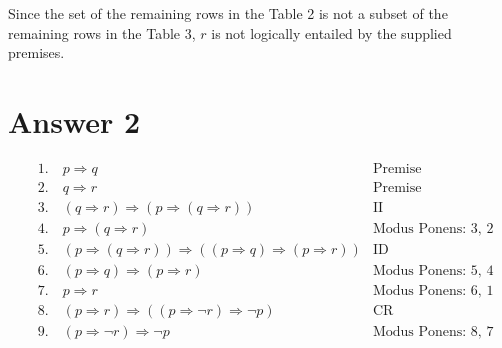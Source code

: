 \documentclass[12pt]{article}
\begin{document}
Since the set of the remaining rows in the Table 2 is not a subset of the remaining rows in the Table 3, $r$ is not logically entailed by the supplied premises.

\section*{Answer 2}

\begin{align*}
    & 1. \hspace{1em} p \Rightarrow q                                                                                    & \text{Premise} \\
    & 2. \hspace{1em} q \Rightarrow r                                                                                    & \text{Premise} \\
    & 3. \hspace{1em} (q \Rightarrow r) \Rightarrow (p \Rightarrow (q \Rightarrow r))                                    & \text{II} \\
    & 4. \hspace{1em} p \Rightarrow (q \Rightarrow r)                                                                    & \text{Modus Ponens: 3, 2} \\
    & 5. \hspace{1em} (p \Rightarrow (q \Rightarrow r)) \Rightarrow ((p \Rightarrow q) \Rightarrow (p \Rightarrow r))    & \text{ID} \\
    & 6. \hspace{1em} (p \Rightarrow q) \Rightarrow (p \Rightarrow r)                                                    & \text{Modus Ponens: 5, 4} \\
    & 7. \hspace{1em} p \Rightarrow r                                                                                    & \text{Modus Ponens: 6, 1} \\
    & 8. \hspace{1em} (p \Rightarrow r) \Rightarrow ((p \Rightarrow \neg r) \Rightarrow \neg p)                          & \text{CR} \\
    & 9. \hspace{1em} (p \Rightarrow \neg r) \Rightarrow \neg p                                                          & \text{Modus Ponens: 8, 7} \\
\end{align*}
\end{document}
